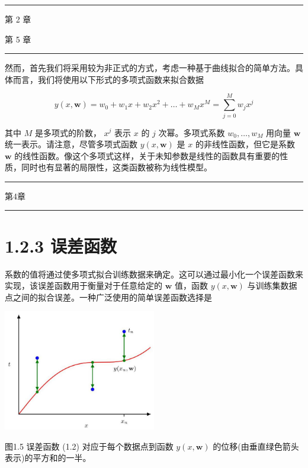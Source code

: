 \documentclass[10pt]{article}
\newcommand{\HRule}{\begin{center}\rule{0.9\linewidth}{0.2mm}\end{center}}
\begin{document}
\HRule

第 2 章

第 5 章

\HRule

然而，首先我们将采用较为非正式的方式，考虑一种基于曲线拟合的简单方法。具体而言，我们将使用以下形式的多项式函数来拟合数据

\[
y\left( {x,\mathbf{w}}\right)  = {w}_{0} + {w}_{1}x + {w}_{2}{x}^{2} + \ldots  + {w}_{M}{x}^{M} = \mathop{\sum }\limits_{{j = 0}}^{M}{w}_{j}{x}^{j} \tag{1.1}
\]

其中 \(M\) 是多项式的阶数， \({x}^{j}\) 表示 \(x\) 的 \(j\) 次幂。多项式系数 \({w}_{0},\ldots ,{w}_{M}\) 用向量 \(\mathbf{w}\) 统一表示。请注意，尽管多项式函数 \(y\left( {x,\mathbf{w}}\right)\) 是 \(x\) 的非线性函数，但它是系数 \(\mathbf{w}\) 的线性函数。像这个多项式这样，关于未知参数是线性的函数具有重要的性质，同时也有显著的局限性，这类函数被称为线性模型。

\HRule

第4章

\HRule

\section*{1.2.3 误差函数}

系数的值将通过使多项式拟合训练数据来确定。这可以通过最小化一个误差函数来实现，该误差函数用于衡量对于任意给定的 \(\mathbf{w}\) 值，函数 \(y\left( {x,\mathbf{w}}\right)\) 与训练集数据点之间的拟合误差。一种广泛使用的简单误差函数选择是

\begin{center}
\includegraphics[max width=0.5\textwidth]{images/0194e279-9b28-703a-88f4-c3ac21e2010d_28_873_342_686_544_0.jpg}
\end{center}
\hspace*{3em} 

图1.5 误差函数 (1.2) 对应于每个数据点到函数 \(y\left( {x,\mathbf{w}}\right)\) 的位移(由垂直绿色箭头表示)的平方和的一半。
\end{document}
